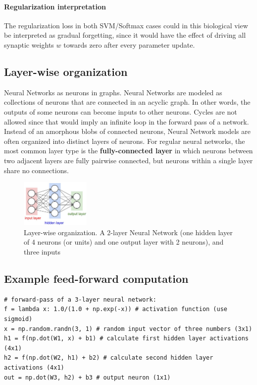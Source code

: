 \paragraph*{Regularization interpretation} The regularization loss in both SVM/Softmax cases could in this biological view be interpreted as gradual forgetting, since it would have the effect of driving all synaptic weights $w$ towards zero after every parameter update.

\subsection*{Layer-wise organization}
Neural Networks as neurons in graphs. Neural Networks are modeled as collections of neurons that are connected in an acyclic graph. In other words, the outputs of some neurons can become inputs to other neurons. Cycles are not allowed since that would imply an infinite loop in the forward pass of a network. Instead of an amorphous blobs of connected neurons, Neural Network models are often organized into distinct layers of neurons. For regular neural networks, the most common layer type is the \textbf{fully-connected layer} in which neurons between two adjacent layers are fully pairwise connected, but neurons within a single layer share no connections. 

\begin{figure}[h]
  \centering
  \includegraphics[width=0.3\textwidth]{Images/nn/2.jpeg}
  \caption{Layer-wise organization. A 2-layer Neural Network (one hidden layer of 4 neurons (or units) and one output layer with 2 neurons), and three inputs}
\end{figure}

\subsection*{Example feed-forward computation}
\begin{lstlisting}[frame=single]
# forward-pass of a 3-layer neural network:
f = lambda x: 1.0/(1.0 + np.exp(-x)) # activation function (use sigmoid)
x = np.random.randn(3, 1) # random input vector of three numbers (3x1)
h1 = f(np.dot(W1, x) + b1) # calculate first hidden layer activations (4x1)
h2 = f(np.dot(W2, h1) + b2) # calculate second hidden layer activations (4x1)
out = np.dot(W3, h2) + b3 # output neuron (1x1)
\end{lstlisting}


